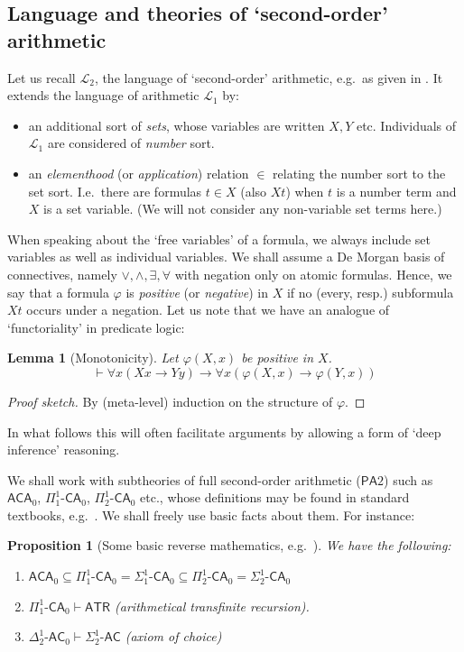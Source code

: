 \documentclass[10pt,a4paper]{amsart}
\theoremstyle{plain}
\newtheorem{proposition}[proposition]{Proposition}
\newtheorem{lemma}[lemma]{Lemma}
\theoremstyle{definition}
\renewcommand{\phi}{\varphi}
\theoremstyle{plain}
\theoremstyle{definition} %
\renewcommand{\lor}{\vee}
\renewcommand{\land}{\wedge}
\newcommand{\limp}{\to}
\newcommand{\Lang}{\mathcal L}
\newcommand{\lang}[1]{\Lang_{#1}}
\newcommand{\langarith}{\lang 1}
\newcommand{\langsoarith}{\lang 2}
\newcommand{\proves}{\vdash}
\newcommand{\Sin}[2]{\Sigma^{#1}_{#2}}
\newcommand{\Pin}[2]{\Pi^{#1}_{#2}}
\newcommand{\Din}[2]{\Delta^{#1}_{#2}}
\newcommand{\PA}{\mathsf{PA}}
\newcommand{\SOPA}{\PA2}
\newcommand{\CA}{\mathsf{CA}}
\newcommand{\AC}{\mathsf{AC}}
\newcommand{\ca}[1]{#1\text{-}\CA}
\newcommand{\ac}[1]{#1\text{-}\AC}
\newcommand{\PCA}{\ca{\Pin 11}_0}
\newcommand{\SCA}{\ca{\Sin 1 1 }_0}
\newcommand{\PSCA}{\ca{\Pin 1 2 }_0}
\newcommand{\SPCA}{\ca{\Sin 1 2 }_0}
\newcommand{\ACA}{\mathsf{ACA}_0}
\newcommand{\ATR}{\mathsf{ATR}}
\begin{document}
\subsection{Language  and theories of `second-order' arithmetic}
Let us recall
$\langsoarith$, the language of `second-order' arithmetic, e.g.\ as given in \cite{Simpson99:monograph}.
It extends the language of arithmetic $\langarith$ by:
\begin{itemize}
    \item an additional sort of \emph{sets}, whose variables are written $X,Y $ etc. Individuals of $\langarith$ are considered of \emph{number} sort.
    \item an \emph{elementhood} (or \emph{application}) relation $\in$ relating the number sort to the set sort. I.e.\ there are formulas $t \in X$ (also $Xt$) when $t $ is a number term and $X$ is a set variable. (We will not consider any non-variable set terms here.)
\end{itemize}

When speaking about the `free variables' of a formula, we always include set variables as well as individual variables.
% 
We shall assume a De Morgan basis of connectives, namely $\lor, \land, \exists, \forall$ with negation only on atomic formulas.
Hence, we say that a formula $\phi$ is \emph{positive} (or \emph{negative}) in $X$ if no (every, resp.) subformula $Xt$ occurs under a negation.
Let us note that we have an analogue of `functoriality' in predicate logic:
\begin{lemma}[Monotonicity]
\label{lem:pos-imp-mon}
Let $\phi(X,x)$ be positive in $X$. 
\[
\proves \forall x (Xx \limp Yy) \limp \forall x (\phi(X,x) \limp \phi(Y,x))
\]
\end{lemma}
\begin{proof}[Proof sketch]
By (meta-level) induction on the structure of $\phi$.
\end{proof}
In what follows this will often facilitate arguments by allowing a form of `deep inference' reasoning.


% 
We shall work with subtheories of full second-order arithmetic ($\SOPA$) such as $ \ACA $, $  \PCA$, $  \PSCA$ etc., whose definitions may be found in standard textbooks, e.g.\ \cite{Simpson99:monograph}.
We shall freely use basic facts about them.
For instance:

\begin{proposition}
    [Some basic reverse mathematics, e.g.\ \cite{Simpson99:monograph}]
    \label{prop:basic-rev-math}
    We have the following:
    \begin{enumerate}
        \item\label{item:inclusions-basic-rev-math} $ \ACA \subseteq \PCA = \SCA \subseteq \PSCA = \SPCA $
        \item\label{item:pca-proves-atr-basic-rev-math} $\PCA \proves \ATR$ (\emph{arithmetical transfinite recursion}).
        \item\label{item:psca-proves-spac-basic-rev-math} $\ac{\Din 1 2}_0 \proves \ac{\Sin 1 2}$  (\emph{axiom of choice})
    \end{enumerate}
\end{proposition}
\end{document}
